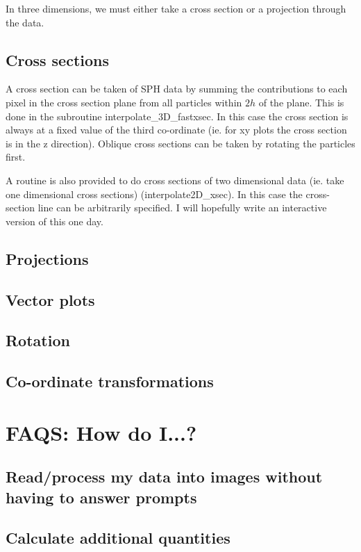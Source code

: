 \documentclass[a4paper,12pt]{article}
\begin{document}
In three dimensions, we must either take a cross section or a projection
through the data.

\subsection{Cross sections}
 A cross section can be taken of SPH data by summing the
contributions to each pixel in the cross section plane from all particles within
$2h$ of the plane. This is done in the subroutine interpolate\_3D\_fastxsec. In
this case the cross section is always at a fixed value of the third co-ordinate
(ie. for xy plots the cross section is in the z direction). Oblique cross
sections can be taken by rotating the particles first.

 A routine is also provided to do cross sections of two dimensional data (ie. take one dimensional
cross sections) (interpolate2D\_xsec). In this case the cross-section line can be arbitrarily
specified. I will hopefully write an interactive version of this one day.


\subsection{Projections}


\subsection{Vector plots}

\subsection{Rotation}


\subsection{Co-ordinate transformations}



\section{FAQS: How do I...?}

\subsection{Read/process my data into images without having to answer prompts}

\subsection{Calculate additional quantities}
\end{document}
